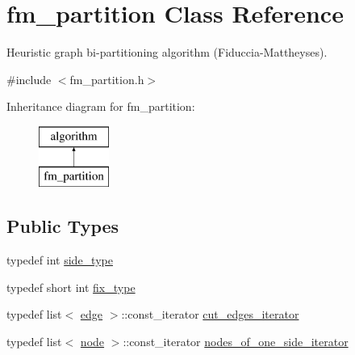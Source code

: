 \hypertarget{classfm__partition}{}\section{fm\+\_\+partition Class Reference}
\label{classfm__partition}


Heuristic graph bi-\/partitioning algorithm (Fiduccia-\/\+Mattheyses).  




{\ttfamily \#include $<$fm\+\_\+partition.\+h$>$}

Inheritance diagram for fm\+\_\+partition\+:\begin{figure}[H]
\begin{center}
\leavevmode
\includegraphics[height=2.000000cm]{classfm__partition}
\end{center}
\end{figure}
\subsection*{Public Types}
\begin{DoxyCompactItemize}
\item 
typedef int \mbox{\hyperlink{classfm__partition_a7cdff1bea3740a287387e8408e16ca79}{side\+\_\+type}}
\item 
typedef short int \mbox{\hyperlink{classfm__partition_a63693cd93d587dca3d1842f831cd1c55}{fix\+\_\+type}}
\item 
typedef list$<$ \mbox{\hyperlink{classedge}{edge}} $>$\+::const\+\_\+iterator \mbox{\hyperlink{classfm__partition_aede10aea3dda6be8014ce60fca728efe}{cut\+\_\+edges\+\_\+iterator}}
\item 
typedef list$<$ \mbox{\hyperlink{classnode}{node}} $>$\+::const\+\_\+iterator \mbox{\hyperlink{classfm__partition_ac8b7b5253476118e5f7bbad2fe8af285}{nodes\+\_\+of\+\_\+one\+\_\+side\+\_\+iterator}}
\end{DoxyCompactItemize}
